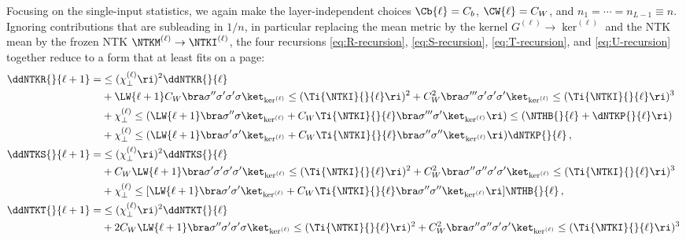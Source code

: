 Focusing on the single-input statistics, we again make the layer-independent choices $\Cb{\ell}=C_b$, $\CW{\ell}=C_W$, and $n_1=\cdots=n_{L-1}\equiv n$. Ignoring contributions that are subleading in $1/n$, in particular replacing the mean metric by the kernel $G^{(\ell)} \to \ker^{(\ell)}$ and the NTK mean by the frozen NTK $\NTKM^{(\ell)} \to \NTKI^{(\ell)}$,  the four recursions  \eqref{eq:R-recursion}, \eqref{eq:S-recursion}, \eqref{eq:T-recursion}, and \eqref{eq:U-recursion} together reduce to a form that at least fits on a page:
\begin{align}\label{eq:R-recursions-single-input}\index{ddNTKs!statistics!R-recursion@$R$-recursion}
\ddNTKR{}{\ell+1}=&\le(\chi_{\perp}^{(\ell)}\ri)^2\ddNTKR{}{\ell}\, \\
&+\LW{\ell+1}C_W\bra\sigma^{\prime\prime}\sigma^{\prime}\sigma^{\prime}\sigma\ket_{\ker^{(\ell)}}\le(\Ti{\NTKI}{}{\ell}\ri)^2+C_W^2\bra\sigma^{\prime\prime\prime}\sigma^{\prime}\sigma^{\prime}\sigma^{\prime}\ket_{\ker^{(\ell)}}\le(\Ti{\NTKI}{}{\ell}\ri)^3\, \notag\\
&+\chi_{\perp}^{(\ell)}\le(\LW{\ell+1}\bra\sigma^{\prime\prime}\sigma\ket_{\ker^{(\ell)}}+C_W\Ti{\NTKI}{}{\ell}\bra\sigma^{\prime\prime\prime}\sigma^{\prime}\ket_{\ker^{(\ell)}}\ri)\le(\NTHB{}{\ell}+\dNTKP{}{\ell}\ri)\, \notag\\
&+\chi_{\perp}^{(\ell)}\le(\LW{\ell+1}\bra\sigma^{\prime}\sigma^{\prime}\ket_{\ker^{(\ell)}}+C_W\Ti{\NTKI}{}{\ell}\bra\sigma^{\prime\prime}\sigma^{\prime\prime}\ket_{\ker^{(\ell)}}\ri)\dNTKP{}{\ell}\, ,\notag\\
\label{eq:S-recursions-single-input}\index{ddNTKs!statistics!S-recursion@$S$-recursion}
\ddNTKS{}{\ell+1}=&\le(\chi_{\perp}^{(\ell)}\ri)^2\ddNTKS{}{\ell}\, \\
&+C_W\LW{\ell+1}\bra \sigma^{\prime} \sigma^{\prime} \sigma^{\prime}\sigma^{\prime}\ket_{\ker^{(\ell)}}\le(\Ti{\NTKI}{}{\ell}\ri)^2+C_W^2\bra \sigma^{\prime\prime}\sigma^{\prime\prime}\sigma^{\prime}\sigma^{\prime}\ket_{\ker^{(\ell)}}\le(\Ti{\NTKI}{}{\ell}\ri)^3\, \notag\\
&+\chi_{\perp}^{(\ell)}\le[\LW{\ell+1}\bra \sigma^{\prime}\sigma^{\prime}\ket_{\ker^{(\ell)}}+C_W\Ti{\NTKI}{}{\ell}\bra \sigma^{\prime\prime}\sigma^{\prime\prime}\ket_{\ker^{(\ell)}}\ri]\NTHB{}{\ell}\, ,\notag\\
\label{eq:T-recursions-single-input}\index{ddNTKs!statistics!T-recursion@$T$-recursion}
\ddNTKT{}{\ell+1}=&\le(\chi_{\perp}^{(\ell)}\ri)^2\ddNTKT{}{\ell}\, \\
&+2C_W\LW{\ell+1}\bra \sigma^{\prime\prime}\sigma^{\prime}\sigma^{\prime}\sigma\ket_{\ker^{(\ell)}}\le(\Ti{\NTKI}{}{\ell}\ri)^2+C_W^2\bra \sigma^{\prime\prime} \sigma^{\prime\prime} \sigma^{\prime}\sigma^{\prime}\ket_{\ker^{(\ell)}}\le(\Ti{\NTKI}{}{\ell}\ri)^3\, \notag\\

\end{align}
